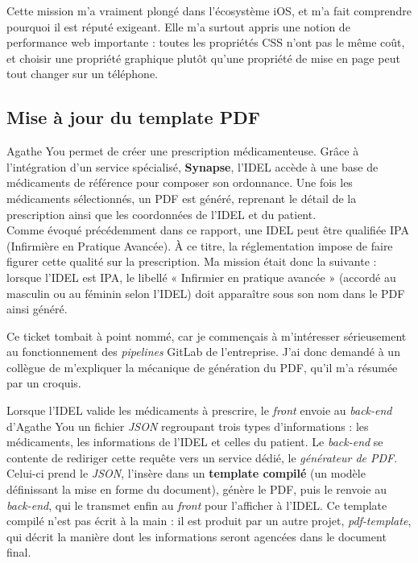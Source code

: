 \documentclass{article}
\begin{document}
Cette mission m'a vraiment plongé dans l'écosystème iOS, et m'a fait comprendre pourquoi il est réputé exigeant. Elle m'a surtout appris une notion de performance web importante : toutes les propriétés CSS n'ont pas le même coût, et choisir une propriété graphique plutôt qu'une propriété de mise en page peut tout changer sur un téléphone.

\subsection{Mise à jour du template PDF}

Agathe You permet de créer une prescription médicamenteuse. Grâce à l'intégration d'un service spécialisé, \textbf{Synapse}, l'IDEL accède à une base de médicaments de référence pour composer son ordonnance. Une fois les médicaments sélectionnés, un PDF est généré, reprenant le détail de la prescription ainsi que les coordonnées de l'IDEL et du patient.\\

Comme évoqué précédemment dans ce rapport, une IDEL peut être qualifiée IPA (Infirmière en Pratique Avancée). À ce titre, la réglementation impose de faire figurer cette qualité sur la prescription. Ma mission était donc la suivante : lorsque l'IDEL est IPA, le libellé « Infirmier en pratique avancée » (accordé au masculin ou au féminin selon l'IDEL) doit apparaître sous son nom dans le PDF ainsi généré.\\


Ce ticket tombait à point nommé, car je commençais à m'intéresser sérieusement au fonctionnement des \textit{pipelines} GitLab de l'entreprise. J'ai donc demandé à un collègue de m'expliquer la mécanique de génération du PDF, qu'il m'a résumée par un croquis.\\


Lorsque l'IDEL valide les médicaments à prescrire, le \textit{front} envoie au \textit{back-end} d'Agathe You un fichier \textit{JSON} regroupant trois types d'informations : les médicaments, les informations de l'IDEL et celles du patient. Le \textit{back-end} se contente de rediriger cette requête vers un service dédié, le \textit{générateur de PDF}. Celui-ci prend le \textit{JSON}, l'insère dans un \textbf{template compilé} (un modèle définissant la mise en forme du document), génère le PDF, puis le renvoie au \textit{back-end}, qui le transmet enfin au \textit{front} pour l'afficher à l'IDEL. Ce template compilé n'est pas écrit à la main : il est produit par un autre projet, \textit{pdf-template}, qui décrit la manière dont les informations seront agencées dans le document final.\\
\end{document}
